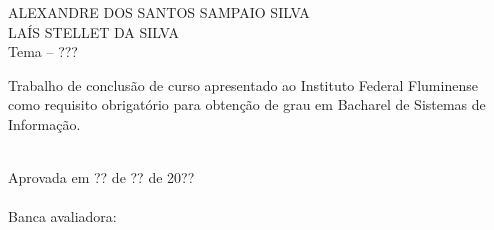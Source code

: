 \begin{folhadeaprovacao}
    \setlength{\ABNTsignthickness}{0.4pt}
    \setlength{\ABNTsignwidth}{15cm}
    \setlength{\ABNTsignskip}{0.9cm}
    \begin{center}
        {\large ALEXANDRE DOS SANTOS SAMPAIO SILVA} \\ [2cm]
        {\large LAÍS STELLET DA SILVA} \\ [2cm]
        {\large Tema -- ??? }\\ [2cm]
        \hspace{.45\textwidth} %
        \begin{minipage}{0.5\textwidth}
        \begin{espacosimples}
        Trabalho de conclusão de curso apresentado ao Instituto Federal Fluminense como requisito obrigatório para obtenção de grau em Bacharel de Sistemas de Informação.\\\\
        \end{espacosimples}
        \end{minipage}
    \end{center}
    Aprovada em ?? de ?? de 20?? \\\\
    Banca avaliadora:
\end{folhadeaprovacao}

